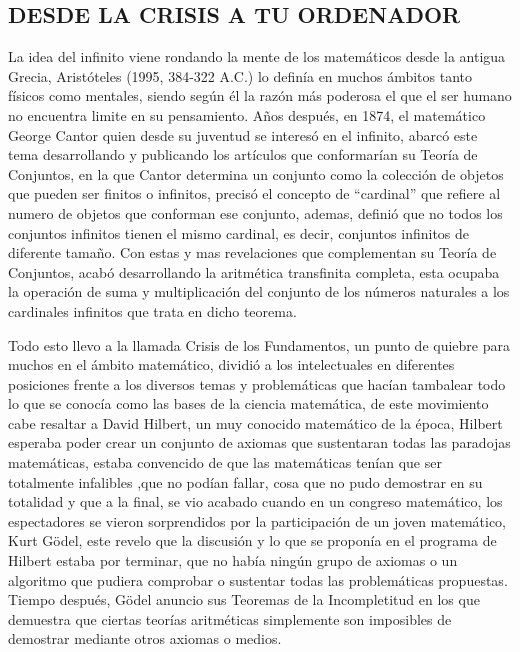 \documentclass[12pt]{article}
\begin{document}
\begin{center}
\section{ DESDE LA CRISIS A TU ORDENADOR}
\end{center}
\begin{flushleft}
\vspace{25PT}
\large
La idea del infinito viene rondando la mente de los matemáticos desde la antigua Grecia, Aristóteles (1995, 384-322 A.C.) lo definía en muchos ámbitos tanto físicos como mentales, siendo según él la razón más poderosa el que el ser humano no encuentra limite en su pensamiento. \cite{Aris}
Años después, en 1874, el matemático George Cantor quien desde su juventud se interesó en el infinito, abarcó este tema desarrollando y publicando los artículos que conformarían su Teoría de Conjuntos, en la que Cantor determina un conjunto como la colección de objetos que pueden ser finitos o infinitos, precisó el concepto de “cardinal” que refiere al numero de objetos que conforman ese conjunto, ademas, definió que no todos los conjuntos infinitos tienen el mismo cardinal, es decir, conjuntos infinitos de diferente tamaño. Con estas y mas revelaciones que complementan su Teoría de Conjuntos, acabó desarrollando la aritmética transfinita completa, esta ocupaba la operación de suma y multiplicación del conjunto de los números naturales a los cardinales infinitos que trata en dicho teorema.
\cite{Cantor}


\vspace{10PT}


\vspace{15PT}
Todo esto llevo a la llamada Crisis de los Fundamentos, un punto de quiebre para muchos en el ámbito matemático, dividió a los intelectuales en diferentes posiciones frente a los diversos temas y problemáticas que hacían tambalear todo lo que se conocía como las bases de la ciencia matemática, de este movimiento cabe resaltar a David Hilbert, un muy conocido matemático de la época, Hilbert esperaba poder crear un conjunto de axiomas que sustentaran todas las paradojas matemáticas, estaba convencido de que las matemáticas tenían que ser totalmente infalibles ,que no podían fallar, cosa que no pudo demostrar en su totalidad y que a la final, se vio acabado cuando en un congreso matemático, los espectadores se vieron sorprendidos por la participación de un joven matemático, Kurt Gödel, este revelo que la discusión y lo que se proponía en el programa de Hilbert estaba por terminar, que no había ningún grupo de axiomas o un algoritmo que pudiera comprobar o sustentar todas las problemáticas propuestas. Tiempo después, Gödel anuncio sus Teoremas de la Incompletitud en los que demuestra que ciertas teorías aritméticas simplemente son imposibles de demostrar mediante otros axiomas o medios.


\end{flushleft}
\end{document}
